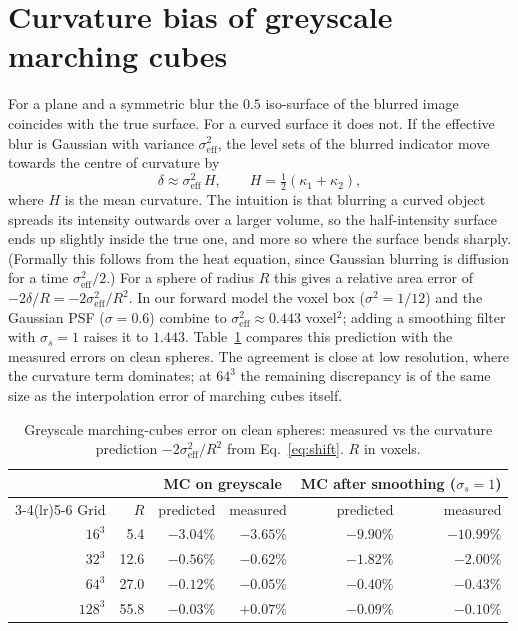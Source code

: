 \section{Curvature bias of greyscale marching cubes}\label{app:curvature}
For a plane and a symmetric blur the
$0.5$ iso-surface of the blurred image coincides with the true surface. For a curved surface it does
not. If the effective blur is Gaussian with variance $\sigma_\text{eff}^2$, the level sets of the
blurred indicator move towards the centre of curvature by
\begin{equation}
  \delta \approx \sigma_\text{eff}^2\,H, \qquad H = \tfrac12(\kappa_1+\kappa_2),
  \label{eq:shift}
\end{equation}
where $H$ is the mean curvature. The intuition is that blurring a curved object spreads its intensity
outwards over a larger volume, so the half-intensity surface ends up slightly inside the true one, and
more so where the surface bends sharply. (Formally this follows from the heat equation, since Gaussian
blurring is diffusion for a time $\sigma_\text{eff}^2/2$.) For a sphere of radius $R$ this gives a relative area error of
$-2\delta/R = -2\sigma_\text{eff}^2/R^2$. In our forward model the voxel box ($\sigma^2 = 1/12$) and the
Gaussian PSF ($\sigma = 0.6$) combine to $\sigma_\text{eff}^2 \approx 0.443$ voxel$^2$; adding a
smoothing filter with $\sigma_s = 1$ raises it to $1.443$. Table~\ref{tab:curvature} compares this
prediction with the measured errors on clean spheres. The agreement is close at low resolution, where
the curvature term dominates; at $64^3$ the remaining discrepancy is of the same size as the
interpolation error of marching cubes itself.

\begin{table}[h]
  \centering\footnotesize\setlength{\tabcolsep}{3pt}
  \caption{Greyscale marching-cubes error on clean spheres: measured vs the curvature prediction
  $-2\sigma_\text{eff}^2/R^2$ from Eq.~\eqref{eq:shift}. $R$ in voxels.}
  \label{tab:curvature}
  \begin{tabular}{rrrrrr}
    \toprule
    & & \multicolumn{2}{c}{MC on greyscale} & \multicolumn{2}{c}{MC after smoothing ($\sigma_s=1$)}\\
    \cmidrule(lr){3-4}\cmidrule(lr){5-6}
    Grid & $R$ & predicted & measured & predicted & measured \\
    \midrule
    $16^3$ & 5.4  & $-3.04\%$ & $-3.65\%$ & $-9.90\%$ & $-10.99\%$ \\
    $32^3$ & 12.6 & $-0.56\%$ & $-0.62\%$ & $-1.82\%$ & $-2.00\%$ \\
    $64^3$ & 27.0 & $-0.12\%$ & $-0.05\%$ & $-0.40\%$ & $-0.43\%$ \\
    $128^3$ & 55.8 & $-0.03\%$ & $+0.07\%$ & $-0.09\%$ & $-0.10\%$ \\
    \bottomrule
  \end{tabular}
\end{table}

